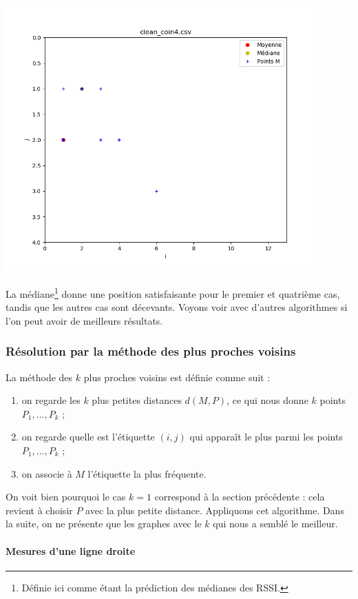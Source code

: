 \documentclass[french, a4paper, 12pt, parskip]{scrartcl}
\begin{document}
\begin{center}
  \includegraphics[width=0.9\textwidth]{finger1-f4.png}
\end{center}
La médiane\footnote{Définie ici comme étant la prédiction des médianes des
RSSI.} donne une position satisfaisante pour le premier et quatrième cas, tandis
que les autres cas sont décevants. Voyons voir avec d'autres algorithmes si
l'on peut avoir de meilleurs résultats.

\subsubsection{Résolution par la méthode des plus proches voisins}

La méthode des $k$ plus proches voisins est définie comme suit :
\begin{enumerate}
  \item on regarde les $k$ plus petites distances $d(M, P)$, ce qui nous donne
    $k$ points $P_1, \dotsc, P_k$ ;
  \item on regarde quelle est l'étiquette $(i, j)$ qui apparaît le plus parmi
    les points $P_1, \dotsc, P_k$ ;
  \item on associe à $M$ l'étiquette la plus fréquente.
\end{enumerate}

On voit bien pourquoi le cas $k=1$ correspond à la section précédente : cela
revient à choisir $P$ avec la plus petite distance. Appliquons cet algorithme.
Dans la suite, on ne présente que les graphes avec le $k$ qui nous a semblé le
meilleur.

\paragraph{Mesures d'une ligne droite}
\end{document}
